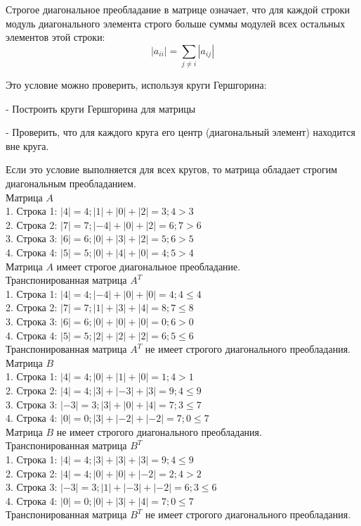 \documentclass[a4paper,14pt]{article}
\begin{document}
Строгое диагональное преобладание в матрице означает, что для каждой строки модуль диагонального элемента строго больше суммы модулей всех остальных элементов этой строки:
$$
|a_{ii}| = \sum_{j\ne i}|a_{ij}|
$$

Это условие можно проверить, используя круги Гершгорина:

- Построить круги Гершгорина для матрицы

- Проверить, что для каждого круга его центр (диагональный элемент) находится вне круга. 

Если это условие выполняется для всех кругов, то матрица обладает строгим диагональным преобладанием.\\

Матрица $A$\\
1. Строка 1: $|4| = 4; |1| + |0| + |2| = 3; 4>3$\\
2. Строка 2: $|7| = 7; |-4| + |0| + |2| = 6; 7>6$\\
3. Строка 3: $|6| = 6; |0| + |3| + |2| = 5; 6 > 5$\\
4. Строка 4: $|5| = 5; |0| + |4| + |0| = 4; 5 > 4$\\
Матрица $A$ имеет строгое диагональное преобладание.\\

Транспонированная матрица $A^T$\\
1. Строка 1: $|4| = 4;  |-4| + |0| + |0| = 4; 4 \leq 4$\\
2. Строка 2: $|7| = 7; |1| + |3| + |4| = 8; 7 \leq 8$\\
3. Строка 3: $|6| = 6; |0| + |0| + |0| = 0; 6 > 0$\\
4. Строка 4: $|5| = 5; |2| + |2| + |2| = 6; 5 \leq 6$\\
Транспонированная матрица $A^T$ не имеет строгого диагонального преобладания.\\

Матрица $B$\\
1. Строка 1: $|4|=4; |0| + |1| + |0| = 1; 4 > 1$\\
2. Строка 2: $|4| = 4; |3| + |-3| + |3| = 9; 4 \leq 9$\\
3. Строка 3: $|-3| = 3; |3| + |0| + |4| = 7; 3 \leq 7$\\
4. Строка 4: $|0| = 0; |3| + |-2| + |-2| = 7; 0 \leq 7$\\
Матрица $B$ не имеет строгого диагонального преобладания.\\

Транспонированная матрица $B^T$\\
1. Строка 1: $|4| = 4; |3| + |3| + |3| = 9; 4 \leq 9$\\
2. Строка 2: $|4| = 4; |0| + |0| + |-2| = 2; 4 > 2$\\
3. Строка 3: $|-3| = 3; |1| + |-3| + |-2| = 6; 3 \leq 6$\\
4. Строка 4: $|0| = 0; |0| + |3| + |4| = 7; 0 \leq 7$\\
Транспонированная матрица $B^T$ не имеет строгого диагонального преобладания.\\
\end{document}
